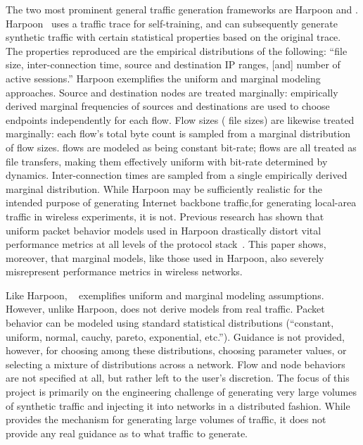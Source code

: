 \documentclass[twocolumn,final]{svjour3}
\begin{document}
The two most prominent general traffic generation frameworks are Harpoon and . Harpoon~\cite{Sommers04} uses a traffic trace for self-training, and can subsequently generate synthetic traffic with certain statistical properties based on the original trace.
The properties reproduced are the empirical distributions of the following: ``file size, inter-connection time, source and destination IP ranges, [and] number of active sessions.''
Harpoon exemplifies the uniform and marginal modeling approaches.
Source and destination nodes are treated marginally: empirically derived marginal frequencies of sources and destinations are used to choose endpoints independently for each flow.
Flow sizes ( file sizes) are likewise treated marginally: each flow's total byte  count is sampled from a marginal distribution of flow sizes.
 flows are modeled as being constant bit-rate;
 flows are all treated as file transfers, making them effectively uniform with bit-rate determined by  dynamics.
Inter-connection times are sampled from a single empirically derived marginal distribution.
While Harpoon may be sufficiently realistic for the intended purpose of generating Internet backbone traffic,\harpoonnote for generating local-area traffic in wireless experiments, it is not.
Previous research has shown that uniform packet behavior models used in Harpoon drastically distort vital performance metrics at all levels of the protocol stack~\cite{Karpinski07:cbr-failure}.
This paper shows, moreover, that marginal models, like those used in Harpoon, also severely misrepresent performance metrics in wireless networks.

Like Harpoon, ~\cite{Avallone04} exemplifies uniform and marginal modeling assumptions. However, unlike Harpoon,  does not derive models from real traffic.
Packet behavior can be modeled using standard statistical distributions (``constant, uniform, normal, cauchy, pareto, exponential, etc.'').
Guidance is not provided, however, for choosing among these distributions, choosing parameter values, or selecting a mixture of distributions across a network.
Flow and node behaviors are not specified at all, but rather left to the user's discretion.
The focus of this project is primarily on the engineering challenge of generating very large volumes of synthetic traffic and injecting it into networks in a distributed fashion.
While  provides the mechanism for generating large volumes of traffic, it does not provide any real guidance as to what traffic to generate.
\end{document}
